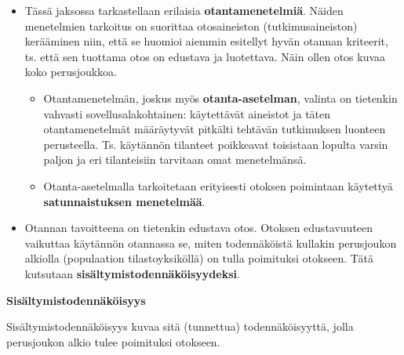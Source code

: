 \documentclass[
]{book}
\providecommand{\tightlist}{%
  \setlength{\itemsep}{0pt}\setlength{\parskip}{0pt}}
\begin{document}
\begin{itemize}
\tightlist
\item
  Tässä jaksossa tarkastellaan erilaisia \textbf{otantamenetelmiä}. Näiden menetelmien tarkoitus on suorittaa otosaineiston (tutkimusaineiston) kerääminen niin, että se huomioi aiemmin esitellyt hyvän otannan kriteerit, ts. että sen tuottama otos on edustava ja luotettava. Näin ollen otos kuvaa koko perusjoukkoa.

  \begin{itemize}
  \tightlist
  \item
    Otantamenetelmän, joskus myös \textbf{otanta-asetelman}, valinta on tietenkin vahvasti sovellusalakohtainen: käytettävät aineistot ja täten otantamenetelmät määräytyvät pitkälti tehtävän tutkimuksen luonteen perusteella. Ts. käytännön tilanteet poikkeavat toisistaan lopulta varsin paljon ja eri tilanteisiin tarvitaan omat menetelmänsä.
  \item
    Otanta-asetelmalla tarkoitetaan erityisesti otoksen poimintaan käytettyä \textbf{satunnaistuksen menetelmää}.
  \end{itemize}
\item
  Otannan tavoitteena on tietenkin edustava otos. Otoksen edustavuuteen vaikuttaa käytännön otannassa se, miten todennäköistä kullakin perusjoukon alkiolla (populaation tilastoyksiköllä) on tulla poimituksi otokseen. Tätä kutsutaan \textbf{sisältymistodennäköisyydeksi}.
\end{itemize}

\begin{defblock}{}
\textbf{Sisältymistodennäköisyys}

Sisältymistodennäköisyys kuvaa sitä (tunnettua) todennäköisyyttä, jolla perusjoukon alkio tulee poimituksi otokseen.

\end{defblock}
\end{document}
